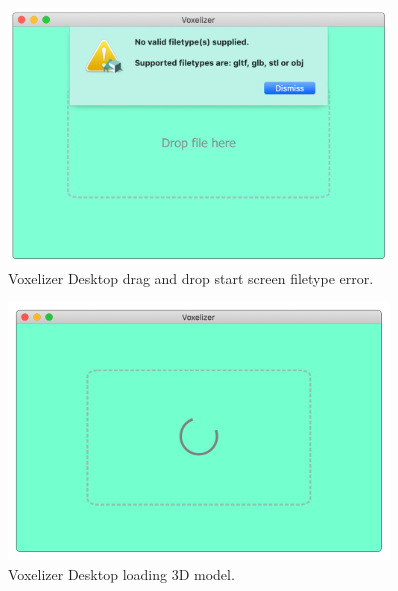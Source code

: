 \begin{figure}[htp]
    \centering
    \includegraphics[width=0.9\textwidth]{sections/result/figures/voxelizer-desktop-gui-dnd-file-warning.png}
    \caption{Voxelizer Desktop drag and drop start screen filetype error.}
    \label{fig:voxelizer-desktop-gui-dnd-file-warning}
\end{figure}
\begin{figure}[htp]
    \centering
    \includegraphics[width=0.9\textwidth]{sections/result/figures/voxelizer-desktop-gui-loading.png}
    \caption{Voxelizer Desktop loading 3D model.}
    \label{fig:voxelizer-desktop-gui-loading}
\end{figure}
\clearpage

